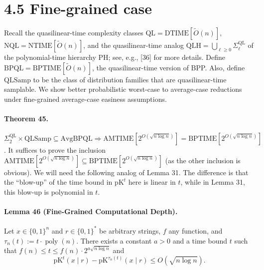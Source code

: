 \section*{4.5 Fine-grained case}
Recall the quasilinear-time complexity classes $\mathrm{QL}=\mathrm{DTIME}[\widetilde O(n)]$, $\mathrm{NQL}=\mathrm{NTIME}[\widetilde O(n)]$, and the quasilinear-time analog $\mathrm{QLH}=\bigcup_{\ell\geq0}\Sigma_\ell^{\mathrm{QL}}$ of the polynomial-time hierarchy PH; see, e.g., [36] for more details. Define $\mathrm{BPQL}=\mathrm{BPTIME}[\widetilde O(n)]$, the quasilinear-time version of BPP. Also, define $\mathrm{QLSamp}$ to be the class of distribution families that are quasilinear-time samplable. We show better probabilistic worst-case to average-case reductions under fine-grained average-case easiness assumptions.
\paragraph{Theorem 45.} $\Sigma_2^{\mathrm{QL}}\times\mathrm{QLSamp}\subseteq\mathrm{AvgBPQL}\Longrightarrow\mathrm{AMTIME}[2^{O(\sqrt{n\log n})}]=\mathrm{BPTIME}[2^{O(\sqrt{n\log n})}]$.
It suffices to prove the inclusion $\mathrm{AMTIME}[2^{O(\sqrt{n\log n})}]\subseteq\mathrm{BPTIME}[2^{O(\sqrt{n\log n})}]$ (as the other inclusion is obvious). We will need the following analog of Lemma 31. The difference is that the ``blow-up'' of the time bound in $\mathrm{pK}^t$ here is linear in $t$, while in Lemma 31, this blow-up is polynomial in $t$.
\paragraph{Lemma 46 (Fine-Grained Computational Depth).} Let $x\in\{0,1\}^n$ and $r\in\{0,1\}^*$ be arbitrary strings, $f$ any function, and $\tau_n(t):=t\cdot\operatorname{poly}(n)$. There exists a constant $a>0$ and a time bound $t$ such that $f(n)\leq t\leq f(n)\cdot2^{a\sqrt{n\log n}}$ and
\[\mathrm{pK}^t(x\mid r)-\mathrm{pK}^{\tau_n(t)}(x\mid r)\leq O(\sqrt{n\log n}).\]
